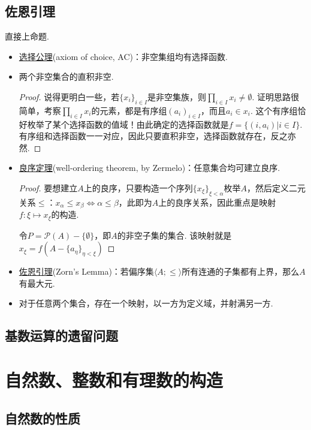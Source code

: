 \subsection{佐恩引理}

直接上命题.
\begin{itemize}
    \item [(1)] \underline{选择公理}(axiom of choice, AC)：非空集组均有选择函数.
    \item [(2)] 两个非空集合的直积非空.
    \begin{proof}
        说得更明白一些，若\(\{x_i\}_{i \in I}\)是非空集族，则\(\prod_{i \in I}x_i \neq \emptyset\). 证明思路很简单，考察\(\prod_{i \in I}x_i\)的元素，都是有序组\((a_i)_{i \in I}\)，而且\(a_i \in x_i\). 这个有序组恰好枚举了某个选择函数的值域！由此确定的选择函数就是\(f = \{(i,a_i)|i \in I\}\). 有序组和选择函数一一对应，因此只要直积非空，选择函数就存在，反之亦然.
    \end{proof}
    \item [(3)] \underline{良序定理}(well-ordering theorem, by Zermelo)：任意集合均可建立良序.
    \begin{proof}
        要想建立\(A\)上的良序，只要构造一个序列\(\{x_\xi\}_{\xi <\alpha}\)枚举\(A\)，然后定义二元关系\(\leq\)：\(x_\alpha \leq x_\beta \Leftrightarrow \alpha \leq \beta\)，此即为\(A\)上的良序关系，因此重点是映射\(f:\xi \mapsto x_\xi\)的构造. 

        令\(P = \mathcal{P}(A) - \{\emptyset\}\)，即\(A\)的非空子集的集合. 该映射就是\(x_\xi = f(A - \{a_\eta\}_{\eta<\xi})\)
    \end{proof}
    \item [(4)] \underline{佐恩引理}(Zorn's Lemma)：若偏序集\(\langle A; \leq \rangle\)所有连通的子集都有上界，那么\(A\)有最大元.
    \item [(5)] 对于任意两个集合，存在一个映射，以一方为定义域，并射满另一方.
\end{itemize}


\subsection{基数运算的遗留问题}

\section{自然数、整数和有理数的构造}

\subsection{自然数的性质}

